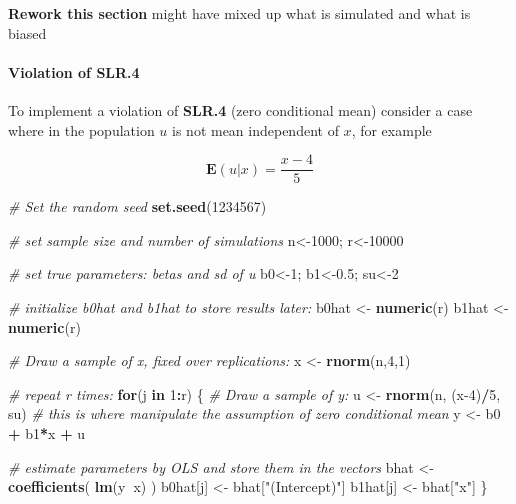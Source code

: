 \documentclass[]{book}
\newenvironment{Shaded}{\begin{snugshade}}{\end{snugshade}}
\newcommand{\CommentTok}[1]{\textcolor[rgb]{0.56,0.35,0.01}{\textit{#1}}}
\newcommand{\ControlFlowTok}[1]{\textcolor[rgb]{0.13,0.29,0.53}{\textbf{#1}}}
\newcommand{\DecValTok}[1]{\textcolor[rgb]{0.00,0.00,0.81}{#1}}
\newcommand{\FloatTok}[1]{\textcolor[rgb]{0.00,0.00,0.81}{#1}}
\newcommand{\KeywordTok}[1]{\textcolor[rgb]{0.13,0.29,0.53}{\textbf{#1}}}
\newcommand{\NormalTok}[1]{#1}
\newcommand{\OperatorTok}[1]{\textcolor[rgb]{0.81,0.36,0.00}{\textbf{#1}}}
\newcommand{\StringTok}[1]{\textcolor[rgb]{0.31,0.60,0.02}{#1}}
\let\oldparagraph\paragraph
\renewcommand{\paragraph}[1]{\oldparagraph{#1}\mbox{}}
\begin{document}
\textbf{Rework this section} might have mixed up what is simulated and
what is biased

\hypertarget{violation-of-slr.4}{%
\paragraph{Violation of SLR.4}\label{violation-of-slr.4}}

To implement a violation of \textbf{SLR.4} (zero conditional mean)
consider a case where in the population \(u\) is not mean independent of
\(x\), for example

\[
\mathbf{E}(u|x) = \frac{x-4}{5}
\]

\begin{Shaded}
\begin{Highlighting}[]
\CommentTok{# Set the random seed}
\KeywordTok{set.seed}\NormalTok{(}\DecValTok{1234567}\NormalTok{)}

\CommentTok{# set sample size and number of simulations}
\NormalTok{n<-}\DecValTok{1000}\NormalTok{; r<-}\DecValTok{10000}

\CommentTok{# set true parameters: betas and sd of u}
\NormalTok{b0<-}\DecValTok{1}\NormalTok{; b1<-}\FloatTok{0.5}\NormalTok{; su<-}\DecValTok{2}

\CommentTok{# initialize b0hat and b1hat to store results later:}
\NormalTok{b0hat <-}\StringTok{ }\KeywordTok{numeric}\NormalTok{(r)}
\NormalTok{b1hat <-}\StringTok{ }\KeywordTok{numeric}\NormalTok{(r)}

\CommentTok{# Draw a sample of x, fixed over replications:}
\NormalTok{x <-}\StringTok{ }\KeywordTok{rnorm}\NormalTok{(n,}\DecValTok{4}\NormalTok{,}\DecValTok{1}\NormalTok{)}

\CommentTok{# repeat r times:}
\ControlFlowTok{for}\NormalTok{(j }\ControlFlowTok{in} \DecValTok{1}\OperatorTok{:}\NormalTok{r) \{}
\CommentTok{# Draw a sample of y:}
\NormalTok{u <-}\StringTok{ }\KeywordTok{rnorm}\NormalTok{(n, (x}\DecValTok{-4}\NormalTok{)}\OperatorTok{/}\DecValTok{5}\NormalTok{, su) }\CommentTok{# this is where manipulate the assumption of zero conditional mean}
\NormalTok{y <-}\StringTok{ }\NormalTok{b0 }\OperatorTok{+}\StringTok{ }\NormalTok{b1}\OperatorTok{*}\NormalTok{x }\OperatorTok{+}\StringTok{ }\NormalTok{u}

\CommentTok{# estimate parameters by OLS and store them in the vectors}
\NormalTok{bhat <-}\StringTok{ }\KeywordTok{coefficients}\NormalTok{( }\KeywordTok{lm}\NormalTok{(y}\OperatorTok{~}\NormalTok{x) )}
\NormalTok{b0hat[j] <-}\StringTok{ }\NormalTok{bhat[}\StringTok{"(Intercept)"}\NormalTok{]}
\NormalTok{b1hat[j] <-}\StringTok{ }\NormalTok{bhat[}\StringTok{"x"}\NormalTok{]}
\NormalTok{\}}
\end{Highlighting}
\end{Shaded}
\end{document}
